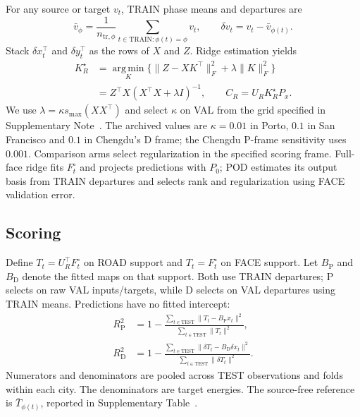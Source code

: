 \documentclass[11pt]{article}
\newcommand{\argmin}{\operatorname*{arg\,min}}
\begin{document}
For any source or target $v_t$, TRAIN phase means and departures are
\begin{equation}\label{eq:m-centre}
 \bar v_\phi=\frac{1}{n_{\mathrm{tr},\phi}}
 \sum_{t\in\mathrm{TRAIN}:\phi(t)=\phi}v_t,
 \qquad \delta v_t=v_t-\bar v_{\phi(t)} .
\end{equation}
Stack $\delta x_t^\top$ and $\delta y_t^\top$ as the rows of $X$ and $Z$. Ridge estimation yields
\begin{equation}\label{eq:m-fit}
 \begin{aligned}
 K_R^\star&=\argmin_K\{\|Z-XK^\top\|_F^2+\lambda\|K\|_F^2\}\\
 &=Z^\top X(X^\top X+\lambda I)^{-1},\qquad
 C_R=U_RK_R^\star P_x .
 \end{aligned}
\end{equation}
We use $\lambda=\kappa s_{\max}(XX^\top)$ and select $\kappa$ on VAL from the grid specified in Supplementary Note~. The archived values are $\kappa=0.01$ in Porto, $0.1$ in San Francisco and $0.1$ in Chengdu's D frame; the Chengdu P-frame sensitivity uses $0.001$. Comparison arms select regularization in the specified scoring frame. Full-face ridge fits $F_t^\circ$ and projects predictions with $P_0$; POD estimates its output basis from TRAIN departures and selects rank and regularization using FACE validation error.

\subsection{Scoring}\label{sec:m-frames}

Define $T_t=U_R^\top F_t^\circ$ on ROAD support and $T_t=F_t^\circ$ on FACE support. Let $B_{\mathrm P}$ and $B_{\mathrm D}$ denote the fitted maps on that support. Both use TRAIN departures; P selects on raw VAL inputs/targets, while D selects on VAL departures using TRAIN means. Predictions have no fitted intercept:
\begin{equation}\label{eq:m-scores}
 \begin{aligned}
 R_{\mathrm P}^2&=1-\frac{\sum_{t\in\mathrm{TEST}}\|T_t-B_{\mathrm P}x_t\|^2}
 {\sum_{t\in\mathrm{TEST}}\|T_t\|^2},\\
 R_{\mathrm D}^2&=1-\frac{\sum_{t\in\mathrm{TEST}}\|\delta T_t-B_{\mathrm D}\delta x_t\|^2}
 {\sum_{t\in\mathrm{TEST}}\|\delta T_t\|^2}.
 \end{aligned}
\end{equation}
Numerators and denominators are pooled across TEST observations and folds within each city. The denominators are target energies. The source-free reference is $\bar T_{\phi(t)}$, reported in Supplementary Table~.
\end{document}
